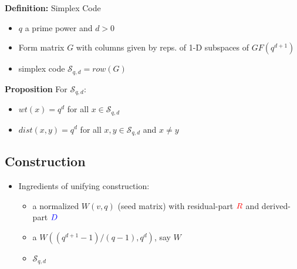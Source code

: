 \documentclass{beamer}
\newcommand{\rred}[1]{\textcolor{red}{#1}}
\newcommand{\bblue}[1]{\textcolor{blue}{#1}}
\begin{document}
\begin{frame}

  \begin{block}{{\bf Definition:} Simplex Code}
    \begin{itemize}
    \item $q$ a prime power and $d>0$
    \item Form matrix $G$ with columns given by reps. of 1-D subspaces of $GF(q^{d+1})$
    \item simplex code $\mathcal{S}_{q,d}=row(G)$
    \end{itemize}
  \end{block}

  \begin{block}{{\bf Proposition}}
    For $\mathcal{S}_{q,d}$:
    \begin{itemize}
    \item $wt(x) = q^d$ for all $x \in \mathcal{S}_{q,d}$
    \item $dist(x,y)=q^d$ for all $x,y \in \mathcal{S}_{q,d}$ and $x \neq y$
    \end{itemize}
  \end{block}
  
\end{frame}


\subsection{Construction}

\begin{frame}

  \begin{itemize}
  \item Ingredients of unifying construction:
    \begin{itemize} 
    \item a normalized $W(v,q)$ (seed matrix) with residual-part $\rred{R}$ and derived-part $\bblue{D}$
    \item a $W((q^{d+1}-1)/(q-1),q^d)$, say $W$
    \item $\mathcal{S}_{q,d}$
    \end{itemize}
  \end{itemize}
  
\end{frame}
\end{document}
